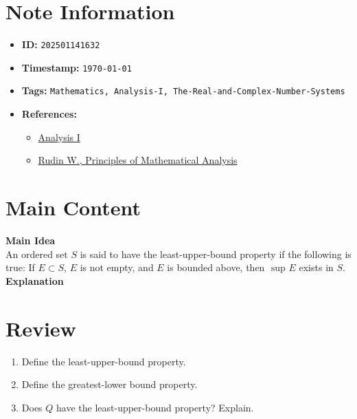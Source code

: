\clearpage
{}
\label{202501141632}
\renewcommand{\notetitle}{Least-Upper-Bound Property}

\section*{Note Information}
\begin{itemize}
  \item \textbf{ID:} \texttt{202501141632}
  \item \textbf{Timestamp:} \texttt{\today \ \currenttime}
  \item \textbf{Tags:} \texttt{Mathematics, Analysis-I, The-Real-and-Complex-Number-Systems}
  \item \textbf{References:}
    \begin{itemize}
      \item \href{https://ocw.mit.edu/courses/18-100b-analysis-i-fall-2010/}{Analysis I}
      \item \href{/home/garrett/Personal/References/Mathematics/Analysis-I/Rudin.pdf}{Rudin W., Principles of Mathematical Analysis}
    \end{itemize}
\end{itemize}


\section*{Main Content}
\textbf{Main Idea}\\
An ordered set $S$ is said to have the least-upper-bound property if the following is true: If $E \subset S$, $E$ is not empty, and $E$ is bounded above, then $\text{ sup } E$ exists in $S$.\\ 

\textbf{Explanation}\\


\section*{Review}
\begin{enumerate}
  \item Define the least-upper-bound property.
  \item Define the greatest-lower bound property.
  \item Does $Q$ have the least-upper-bound property? Explain.
\end{enumerate}


